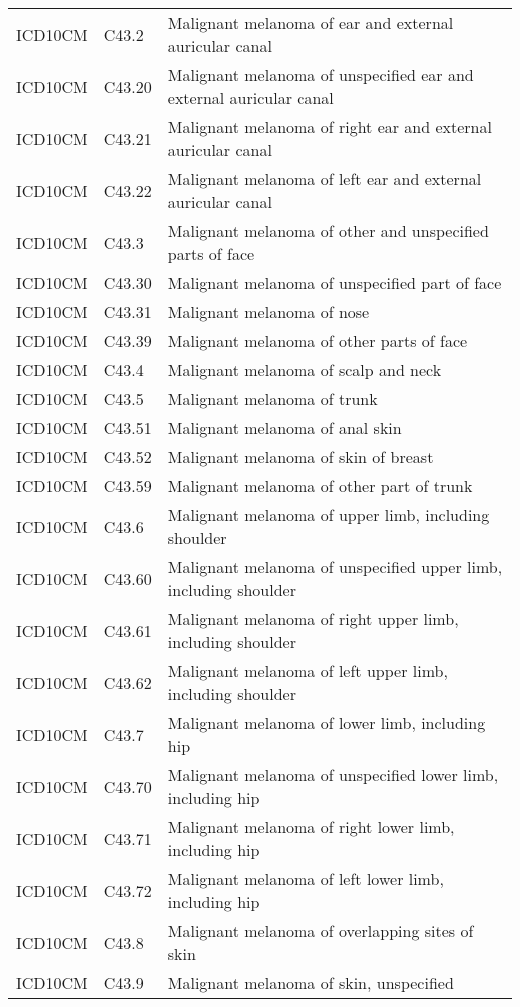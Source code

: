 \begin{longtable}{p{}p{}p{}}
  ICD10CM & C43.2 & Malignant melanoma of ear and external auricular canal \\ 
  ICD10CM & C43.20 & Malignant melanoma of unspecified ear and external auricular canal \\ 
  ICD10CM & C43.21 & Malignant melanoma of right ear and external auricular canal \\ 
  ICD10CM & C43.22 & Malignant melanoma of left ear and external auricular canal \\ 
  ICD10CM & C43.3 & Malignant melanoma of other and unspecified parts of face \\ 
  ICD10CM & C43.30 & Malignant melanoma of unspecified part of face \\ 
  ICD10CM & C43.31 & Malignant melanoma of nose \\ 
  ICD10CM & C43.39 & Malignant melanoma of other parts of face \\ 
  ICD10CM & C43.4 & Malignant melanoma of scalp and neck \\ 
  ICD10CM & C43.5 & Malignant melanoma of trunk \\ 
  ICD10CM & C43.51 & Malignant melanoma of anal skin \\ 
  ICD10CM & C43.52 & Malignant melanoma of skin of breast \\ 
  ICD10CM & C43.59 & Malignant melanoma of other part of trunk \\ 
  ICD10CM & C43.6 & Malignant melanoma of upper limb, including shoulder \\ 
  ICD10CM & C43.60 & Malignant melanoma of unspecified upper limb, including shoulder \\ 
  ICD10CM & C43.61 & Malignant melanoma of right upper limb, including shoulder \\ 
  ICD10CM & C43.62 & Malignant melanoma of left upper limb, including shoulder \\ 
  ICD10CM & C43.7 & Malignant melanoma of lower limb, including hip \\ 
  ICD10CM & C43.70 & Malignant melanoma of unspecified lower limb, including hip \\ 
  ICD10CM & C43.71 & Malignant melanoma of right lower limb, including hip \\ 
  ICD10CM & C43.72 & Malignant melanoma of left lower limb, including hip \\ 
  ICD10CM & C43.8 & Malignant melanoma of overlapping sites of skin \\ 
  ICD10CM & C43.9 & Malignant melanoma of skin, unspecified \\ 

\end{longtable}
